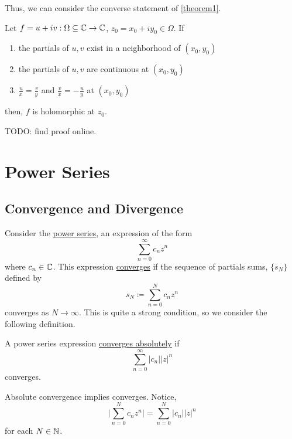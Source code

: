 \documentclass[11pt]{article}
\newcommand*{\pd}[3][]{\ensuremath{\frac{^{#1} #2}{ #3^{#1}}}}
\begin{document}
Thus, we can consider the converse statement of \cref{theorem1}.
\begin{theorem}
	Let $f=u+iv : \Omega \subseteq \mathbb{C} \to \mathbb{C}$, $z_0 = x_0+iy_0 \in \Omega$. If
	\begin{enumerate}
		\item the partials of $u,v$ exist in a neighborhood of $(x_0,y_0)$
		\item the partials of $u,v$ are continuous at $(x_0,y_0)$
		\item $\pd{u}{x} = \pd{v}{y}$ and $\pd{v}{x} =-\pd{u}{y}$ at
			$(x_0,y_0)$
	\end{enumerate}
	then, $f$ is holomorphic at $z_0$.
	\label{theorem2}
\end{theorem}
TODO: find proof online.

\pagebreak
\section{Power Series}
\subsection{Convergence and Divergence}
\begin{example}
	Consider the \underline{power series}, an expression of the form
	\begin{equation*}
		\sum^\infty_{n=0} c_nz^n
	\end{equation*}
	where $c_n \in \mathbb{C}$. This expression \underline{converges} if the sequence of
	partials sums, $\{s_N\}$ defined by
	\begin{equation*}
		s_N \coloneqq \sum^N_{n=0} c_nz^n
	\end{equation*}
	converges as $N \to \infty$. This is quite a strong condition, so we
	consider the following definition.
\end{example}
\begin{definition}
	A power series expression \underline{converges absolutely} if
	\begin{equation*}
		\sum^{\infty}_{n=0} |c_n||z|^n
	\end{equation*}
	converges.
\end{definition}
\begin{remark}
	Absolute convergence implies converges. Notice,
	\begin{equation*}
		\bigg| \sum_{n=0}^N c_n z^n \bigg| = \sum^N_{n=0} |c_n||z|^n
	\end{equation*}
	for each $N \in \mathbb{N}$.
\end{remark}
\end{document}
